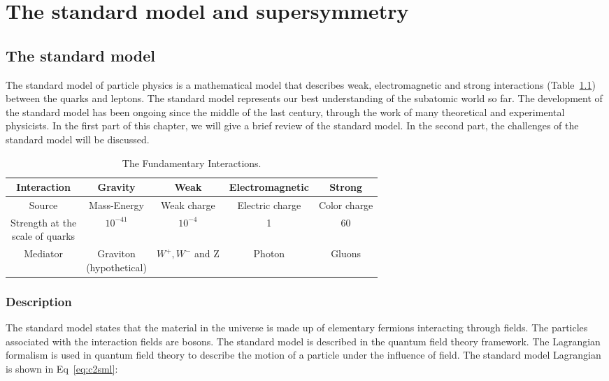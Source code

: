 \chapter{The standard model and supersymmetry}
\section{The standard model}
The standard model of particle physics is a mathematical model that describes weak, electromagnetic and strong interactions (Table~\ref{tab:c24ei}) between the quarks and leptons. The standard model represents our best understanding of the subatomic world so far. The development of the standard model has been ongoing since the middle of the last century, through the work of many theoretical and experimental physicists. In the first part of this chapter, we will give a brief review of the standard model. In the second part, the challenges of the standard model will be discussed. 

\begin{table}[htbp]
\fontsize{10 pt}{1.2 em}
\selectfont
\begin{centering}
\caption{\label{tab:c24ei} The Fundamentary Interactions.}
\hspace*{-4ex}
\begin{tabular}{|c|c|c|c|c|}
\hline
Interaction                                      & Gravity & Weak & Electromagnetic & Strong \\
\hline
Source                                           & Mass-Energy & Weak charge & Electric charge & Color charge \\
\hline
\specialcell{Strength at the \\ scale of quarks} & $10^{-41}$ & $10^{-4}$ & 1 & 60 \\
\hline
Mediator                                         & \specialcell{Graviton\\(hypothetical)} & $W^{+},W^{-}$ and Z & Photon & Gluons \\
\hline
\end{tabular}
\par\end{centering}
\end{table}

\subsection{Description}

The standard model states that the material in the universe is made up of elementary fermions interacting through fields. The particles associated with the interaction fields are bosons. The standard model is described in the quantum field theory framework. The Lagrangian formalism is used in quantum field theory to describe the motion of a particle under the influence of field. The standard model Lagrangian is shown in Eq~\ref{eq:c2sml}: 

